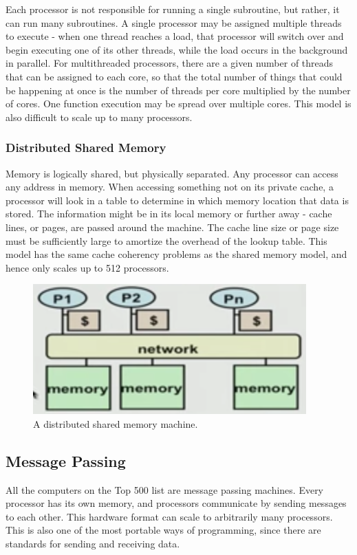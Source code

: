 \documentclass[10pt]{article}
\begin{document}
\begin{flushleft}
Each processor is not responsible for running a single subroutine, but rather, it can run many subroutines. A single processor may be assigned multiple threads to execute - when one thread reaches a load, that processor will switch over and begin executing one of its other threads, while the load occurs in the background in parallel. For multithreaded processors, there are a given number of threads that can be assigned to each core, so that the total number of things that could be happening at once is the number of threads per core multiplied by the number of cores. One function execution may be spread over multiple cores. This model is also difficult to scale up to many processors.

\subsubsection{Distributed Shared Memory}

Memory is logically shared, but physically separated. Any processor can access any address in memory. When accessing something not on its private cache, a processor will look in a table to determine in which memory location that data is stored. The information might be in its local memory or further away - cache lines, or pages, are passed around the machine. The cache line size or page size must be sufficiently large to amortize the overhead of the lookup table. This model has the same cache coherency problems as the shared memory model, and hence only scales up to 512 processors. 

\begin{figure}[H]
\centering
\includegraphics[width=0.5\linewidth]{figures/distributed-shared-memory.pdf}
\caption{A distributed shared memory machine.}
\end{figure}

\subsection{Message Passing}

All the computers on the Top 500 list are message passing machines. Every processor has its own memory, and processors communicate by sending messages to each other. This hardware format can scale to arbitrarily many processors. This is also one of the most portable ways of programming, since there are standards for sending and receiving data.


\end{flushleft}
\end{document}
